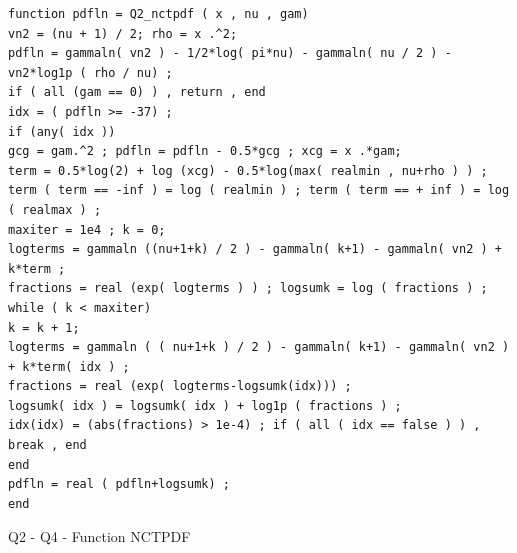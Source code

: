 \documentclass[12pt]{article}
\begin{document}
\begin{Program}[!htb]
\begin{lstlisting}[style=Matlab-editor,basicstyle=\mlttfamily\footnotesize]
%Q2 & Q4 - Function: NCTPDF ------------------------------------------
function pdfln = Q2_nctpdf ( x , nu , gam)
vn2 = (nu + 1) / 2; rho = x .^2;
pdfln = gammaln( vn2 ) - 1/2*log( pi*nu) - gammaln( nu / 2 ) - vn2*log1p ( rho / nu) ;
if ( all (gam == 0) ) , return , end
idx = ( pdfln >= -37) ; 
if (any( idx ))
gcg = gam.^2 ; pdfln = pdfln - 0.5*gcg ; xcg = x .*gam;
term = 0.5*log(2) + log (xcg) - 0.5*log(max( realmin , nu+rho ) ) ;
term ( term == -inf ) = log ( realmin ) ; term ( term == + inf ) = log ( realmax ) ;
maxiter = 1e4 ; k = 0;
logterms = gammaln ((nu+1+k) / 2 ) - gammaln( k+1) - gammaln( vn2 ) + k*term ;
fractions = real (exp( logterms ) ) ; logsumk = log ( fractions ) ;
while ( k < maxiter)
k = k + 1;
logterms = gammaln ( ( nu+1+k ) / 2 ) - gammaln( k+1) - gammaln( vn2 ) + k*term( idx ) ;
fractions = real (exp( logterms-logsumk(idx))) ;
logsumk( idx ) = logsumk( idx ) + log1p ( fractions ) ;
idx(idx) = (abs(fractions) > 1e-4) ; if ( all ( idx == false ) ) , break , end
end
pdfln = real ( pdfln+logsumk) ;
end
\end{lstlisting}
\caption{Q2 - Q4 - Function NCTPDF}
\label{Q2 & Q4 - Function NCTPDF}
\end{Program}
\end{document}
